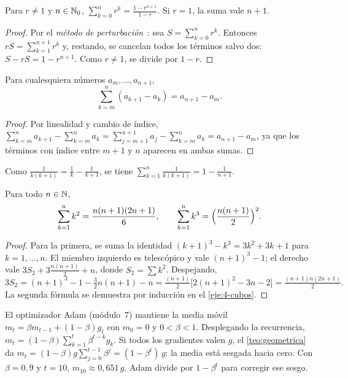 \begin{teorema}\label{teo:geometrica}
Para $r\neq1$ y $n\in\mathbb{N}_0$, $\displaystyle\sum_{k=0}^nr^k=\frac{1-r^{n+1}}{1-r}$. Si $r=1$, la suma vale $n+1$.
\end{teorema}

\begin{proof}
Por el \emph{método de perturbación}~\cite[§2.3]{gkp}: sea $S=\sum_{k=0}^nr^k$. Entonces $rS=\sum_{k=1}^{n+1}r^k$ y, restando, se cancelan todos los términos salvo dos: $S-rS=1-r^{n+1}$. Como $r\neq1$, se divide por $1-r$.
\end{proof}

\begin{proposicion}\label{prop:telescopica}
Para cualesquiera números $a_m,\dots,a_{n+1}$,
\[
\sum_{k=m}^n(a_{k+1}-a_k)=a_{n+1}-a_m.
\]
\end{proposicion}

\begin{proof}
Por linealidad y cambio de índice, $\sum_{k=m}^na_{k+1}-\sum_{k=m}^na_k=\sum_{j=m+1}^{n+1}a_j-\sum_{k=m}^na_k=a_{n+1}-a_m$, ya que los términos con índice entre $m+1$ y $n$ aparecen en ambas sumas.
\end{proof}

\begin{ejemplo}\label{ej:telescopica}
Como $\frac1{k(k+1)}=\frac1k-\frac1{k+1}$, se tiene $\displaystyle\sum_{k=1}^n\frac1{k(k+1)}=1-\frac1{n+1}$.
\end{ejemplo}

\begin{teorema}\label{teo:potencias}
Para todo $n\in\mathbb{N}$,
\[
\sum_{k=1}^nk^2=\frac{n(n+1)(2n+1)}6,\qquad\sum_{k=1}^nk^3=\Bigl(\frac{n(n+1)}2\Bigr)^2.
\]
\end{teorema}

\begin{proof}
Para la primera, se suma la identidad $(k+1)^3-k^3=3k^2+3k+1$ para $k=1,\dots,n$. El miembro izquierdo es telescópico y vale $(n+1)^3-1$; el derecho vale $3S_2+3\frac{n(n+1)}2+n$, donde $S_2=\sum k^2$. Despejando,
\[
3S_2=(n+1)^3-1-\tfrac32n(n+1)-n=\tfrac{(n+1)}{2}\bigl[2(n+1)^2-3n-2\bigr]=\tfrac{(n+1)n(2n+1)}{2}.
\]
La segunda fórmula se demuestra por inducción en el \cref{eje:4-cubos}.
\end{proof}

\begin{ejemplo}\label{ej:ema}
El optimizador Adam (módulo~7) mantiene la media móvil $m_t=\beta m_{t-1}+(1-\beta)g_t$ con $m_0=0$ y $0<\beta<1$. Desplegando la recurrencia, $m_t=(1-\beta)\sum_{k=1}^{t}\beta^{t-k}g_k$. Si todos los gradientes valen $g$, el \cref{teo:geometrica} da $m_t=(1-\beta)g\sum_{j=0}^{t-1}\beta^{j}=(1-\beta^t)\,g$: la media está sesgada hacia cero. Con $\beta=0{,}9$ y $t=10$, $m_{10}\approx0{,}651\,g$. Adam divide por $1-\beta^t$ para corregir ese sesgo.
\end{ejemplo}

